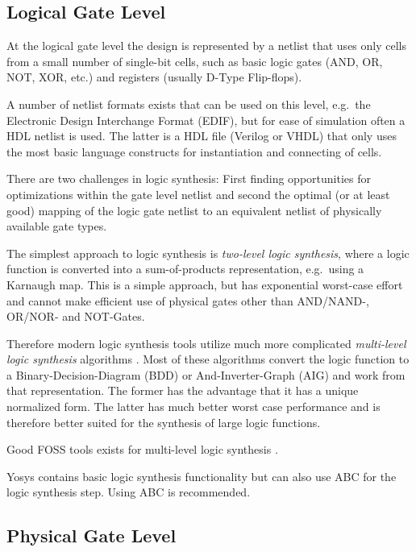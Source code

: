 \subsection{Logical Gate Level}

At the logical gate level the design is represented by a netlist that uses only
cells from a small number of single-bit cells, such as basic logic gates (AND,
OR, NOT, XOR, etc.) and registers (usually D-Type Flip-flops).

A number of netlist formats exists that can be used on this level, e.g.~the Electronic Design
Interchange Format (EDIF), but for ease of simulation often a HDL netlist is used. The latter
is a HDL file (Verilog or VHDL) that only uses the most basic language constructs for instantiation
and connecting of cells.

There are two challenges in logic synthesis: First finding opportunities for optimizations
within the gate level netlist and second the optimal (or at least good) mapping of the logic
gate netlist to an equivalent netlist of physically available gate types.

The simplest approach to logic synthesis is {\it two-level logic synthesis}, where a logic function
is converted into a sum-of-products representation, e.g.~using a Karnaugh map.
This is a simple approach, but has exponential worst-case effort and cannot make efficient use of
physical gates other than AND/NAND-, OR/NOR- and NOT-Gates.

Therefore modern logic synthesis tools utilize much more complicated {\it multi-level logic
synthesis} algorithms \cite{MultiLevelLogicSynth}. Most of these algorithms convert the
logic function to a Binary-Decision-Diagram (BDD) or And-Inverter-Graph (AIG) and work from that
representation. The former has the advantage that it has a unique normalized form. The latter has
much better worst case performance and is therefore better suited for the synthesis of large
logic functions.

Good FOSS tools exists for multi-level logic synthesis 
 .

Yosys contains basic logic synthesis functionality but can also use ABC
 for the logic synthesis step. Using ABC is recommended.

\subsection{Physical Gate Level}

